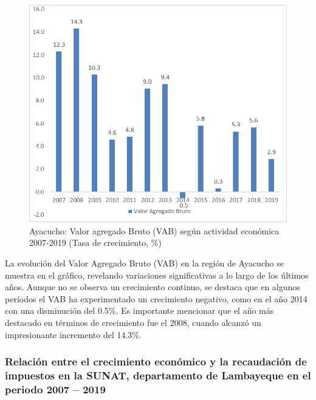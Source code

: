 \documentclass[
  letterpaper,
  DIV=11,
  numbers=noendperiod]{scrartcl}
\begin{document}
\begin{figure}

\caption{\label{fig-4}Ayacucho: Valor agregado Bruto (VAB) según
actividad económica 2007-2019 (Tasa de crecimiento, \%)}

{\centering \includegraphics{20230603230848.png}

}

\end{figure}

La evolución del Valor Agregado Bruto (VAB) en la región de Ayacucho se
muestra en el gráfico, revelando variaciones significativas a lo largo
de los últimos años. Aunque no se observa un crecimiento continuo, se
destaca que en algunos períodos el VAB ha experimentado un crecimiento
negativo, como en el año 2014 con una disminución del 0.5\%. Es
importante mencionar que el año más destacado en términos de crecimiento
fue el 2008, cuando alcanzó un impresionante incremento del 14.3\%.

\hypertarget{relaciuxf3n-entre-el-crecimiento-econuxf3mico-y-la-recaudaciuxf3n-de-impuestos-en-la-sunat-departamento-de-lambayeque-en-el-periodo-2007-2019}{%
\subsubsection{Relación entre el crecimiento económico y la recaudación
de impuestos en la SUNAT, departamento de Lambayeque en el periodo 2007
--
2019}\label{relaciuxf3n-entre-el-crecimiento-econuxf3mico-y-la-recaudaciuxf3n-de-impuestos-en-la-sunat-departamento-de-lambayeque-en-el-periodo-2007-2019}}
\end{document}
